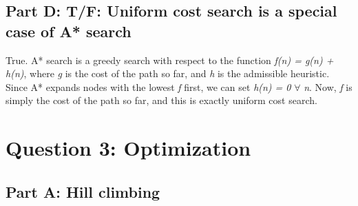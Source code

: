 \documentclass[paper=a4, fontsize=11pt]{scrartcl} %
\numberwithin{equation}{section} %
\numberwithin{figure}{section} %
\numberwithin{table}{section} %
\begin{document}
\subsection{Part D: T/F: Uniform cost search is a special case of A* search}
True. A* search is a greedy search with respect to the function \textit{f(n) = g(n) + h(n)}, where \textit{g} is the cost of the path so far, and \textit{h} is the admissible heuristic. Since A* expands nodes with the lowest \textit{f} first, we can set \textit{h(n) = 0} \(\forall\) \textit{n}. Now, \textit{f} is simply the cost of the path so far, and this is exactly uniform cost search.

\section{Question 3: Optimization}
\subsection{Part A: Hill climbing}
\end{document}
